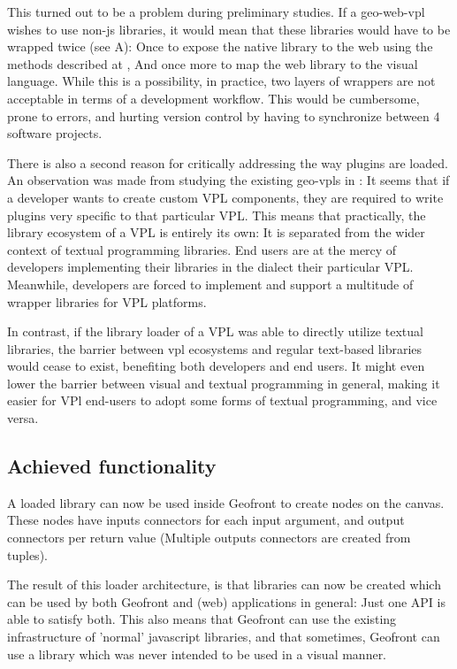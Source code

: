 \begin{note}

  This turned out to be a problem during preliminary studies.
  If a \ac{geo-web-vpl} wishes to use non-js libraries, it would mean that these libraries would have to be wrapped twice (see  A): 
  Once to expose the native library to the web using the methods described at ,
  And once more to map the web library to the visual language. 
  While this is a possibility, in practice, two layers of wrappers are not acceptable in terms of a development workflow.
  This would be cumbersome, prone to errors, and hurting version control by having to synchronize between 4 software projects. 
  
  There is also a second reason for critically addressing the way plugins are loaded. 
  An observation was made from studying the existing geo-vpls in :
  It seems that if a developer wants to create custom VPL components, they are required to write plugins very specific to that particular VPL.
  This means that practically, the library ecosystem of a VPL is entirely its own: 
  It is separated from the wider context of textual programming libraries. 
  End users are at the mercy of developers implementing their libraries in the dialect their particular VPL.
  Meanwhile, developers are forced to implement and support a multitude of wrapper libraries for VPL platforms.  
  
  In contrast, if the library loader of a VPL was able to directly utilize textual libraries, the barrier between vpl ecosystems and regular text-based libraries would cease to exist, benefiting both developers and end users. 
  It might even lower the barrier between visual and textual programming in general, making it easier for VPl end-users to adopt some forms of textual programming, and vice versa. 
  
\end{note}

\subsection{Achieved functionality}
A loaded library can now be used inside Geofront to create nodes on the canvas. 
These nodes have inputs connectors for each input argument, and output connectors per return value (Multiple outputs connectors are created from tuples). 

The result of this loader architecture, is that libraries can now be created which can be used by both Geofront and (web) applications in general:
Just one API is able to satisfy both.
This also means that Geofront can use the existing infrastructure of 'normal' javascript libraries, and that sometimes, Geofront can use a library which was never intended to be used in a visual manner. 

